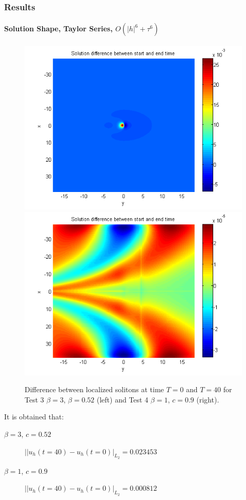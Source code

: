 \documentclass{beamer}
\begin{document}

\begin{frame}
\frametitle{Results}
\framesubtitle{Solution Shape, Taylor Series, $O(|h|^6+\tau^6)$}
\begin{figure}[ht]
	\centering
	\begin{minipage}[b]{0.49\linewidth}
		\includegraphics[width=\linewidth]{../amitans/figures/compare_start_end_bt3_c052.png}
	\end{minipage}	
	\begin{minipage}[b]{0.49\linewidth}
		 \includegraphics[width=\linewidth]{../amitans/figures/compare_start_end_bt1_c09.png}
	\end{minipage}

Difference between localized solitons at time $T=0$ and $T=40$ for Test 3 $\beta = 3$, $\beta = 0.52$  (left) and Test 4 $\beta=1$, $c=0.9$ (right). 
\end{figure}

It is obtained that:
\begin{description}
 \item[$\beta = 3$, $c = 0.52$] $||u_h(t=40)-u_h(t=0)|_{L_2} = 0.023453$
 \item[$\beta = 1$, $c = 0.9$] $||u_h(t=40)-u_h(t=0)|_{L_2} = 0.000812$
\end{description}
\end{frame}
\end{document}
